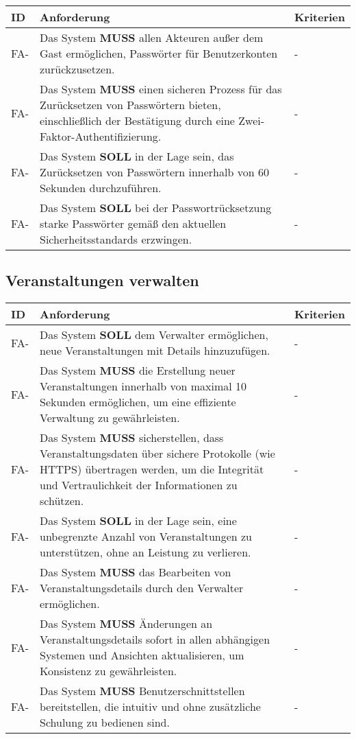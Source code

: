 \begin{tabular} {|p{}|p{11cm}|p{}|}
	\hline
	ID & Anforderung & Kriterien \\
	\hline
	FA-
	& Das System \textbf{MUSS} allen Akteuren außer dem Gast  ermöglichen, Passwörter für Benutzerkonten zurückzusetzen. 
	& - \\
	\hline
	FA-
	& Das System \textbf{MUSS} einen sicheren Prozess für das Zurücksetzen von Passwörtern bieten, einschließlich der Bestätigung durch eine Zwei-Faktor-Authentifizierung. 
	& - \\
	\hline
	FA-
	& Das System \textbf{SOLL} in der Lage sein, das Zurücksetzen von Passwörtern innerhalb von 60 Sekunden durchzuführen. 
	& - \\
	\hline
	FA-
	& Das System \textbf{SOLL} bei der Passwortrücksetzung starke Passwörter gemäß den aktuellen Sicherheitsstandards erzwingen. 
	& - \\
	\hline
\end{tabular}

\vspace{18pt}

\subsection{Veranstaltungen verwalten}
\begin{tabular} {|p{}|p{11cm}|p{}|}
	\hline
	ID & Anforderung & Kriterien \\
	\hline
	FA-
	& Das System \textbf{SOLL} dem Verwalter ermöglichen, neue Veranstaltungen mit Details hinzuzufügen. 
	& - \\
	\hline
	FA-
	& Das System \textbf{MUSS} die Erstellung neuer Veranstaltungen innerhalb von maximal 10 Sekunden ermöglichen, um eine effiziente Verwaltung zu gewährleisten. 
	& - \\
	\hline
	FA-
	& Das System \textbf{MUSS} sicherstellen, dass Veranstaltungsdaten über sichere Protokolle (wie HTTPS) übertragen werden, um die Integrität und Vertraulichkeit der Informationen zu schützen. 
	& - \\
	\hline
	FA-
	& Das System \textbf{SOLL} in der Lage sein, eine unbegrenzte Anzahl von Veranstaltungen zu unterstützen, ohne an Leistung zu verlieren. 
	& - \\
	\hline
	FA-
	& Das System \textbf{MUSS} das Bearbeiten von Veranstaltungsdetails durch den Verwalter ermöglichen. 
	& - \\
	\hline
	FA-
	& Das System \textbf{MUSS} Änderungen an Veranstaltungsdetails sofort in allen abhängigen Systemen und Ansichten aktualisieren, um Konsistenz zu gewährleisten. 
	& - \\
	\hline
	FA-
	& Das System \textbf{MUSS} Benutzerschnittstellen bereitstellen, die intuitiv und ohne zusätzliche Schulung zu bedienen sind. 
	& - \\
	\hline
\end{tabular}

